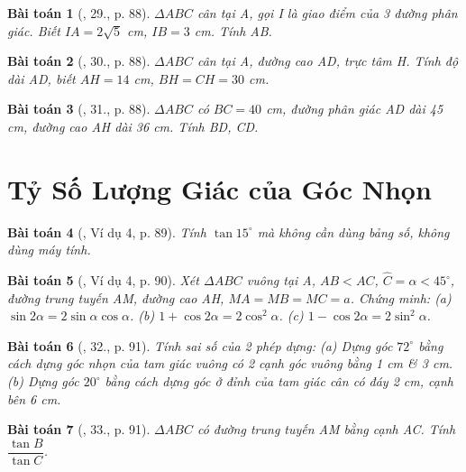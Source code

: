 \documentclass{article}
\newtheorem{baitoan}{Bài toán}
\begin{document}
\begin{baitoan}[\cite{Binh_Toan_9_tap_1}, 29., p. 88]
	$\Delta ABC$ cân tại A, gọi I là giao điểm của 3 đường phân giác. Biết $IA = 2\sqrt{5}$ {\rm cm}, $IB = 3$ {\rm cm}. Tính AB.
\end{baitoan}

\begin{baitoan}[\cite{Binh_Toan_9_tap_1}, 30., p. 88]
	$\Delta ABC$ cân tại A, đường cao AD, trực tâm H. Tính độ dài AD, biết $AH = 14$ {\rm cm}, $BH = CH = 30$ {\rm cm}.
\end{baitoan}

\begin{baitoan}[\cite{Binh_Toan_9_tap_1}, 31., p. 88]
	$\Delta ABC$ có $BC = 40$ {\rm cm}, đường phân giác AD dài {\rm45 cm}, đường cao AH dài {\rm36 cm}. Tính BD, CD.
\end{baitoan}


\section{Tỷ Số Lượng Giác của Góc Nhọn}

\begin{baitoan}[\cite{Binh_Toan_9_tap_1}, Ví dụ 4, p. 89]
	Tính $\tan15^\circ$ mà không cần dùng bảng số, không dùng máy tính.
\end{baitoan}

\begin{baitoan}[\cite{Binh_Toan_9_tap_1}, Ví dụ 4, p. 90]
	Xét $\Delta ABC$ vuông tại A, $AB < AC$, $\widehat{C} = \alpha  < 45^\circ$, đường trung tuyến AM, đường cao AH, $MA = MB = MC = a$. Chứng minh: (a) $\sin2\alpha = 2\sin\alpha\cos\alpha$. (b) $1 + \cos2\alpha = 2\cos^2\alpha$. (c) $1 - \cos2\alpha = 2\sin^2\alpha$.
\end{baitoan}

\begin{baitoan}[\cite{Binh_Toan_9_tap_1}, 32., p. 91]
	Tính sai số của 2 phép dựng: (a) Dựng góc $72^\circ$ bằng cách dựng góc nhọn của tam giác vuông có 2 cạnh góc vuông bằng {\rm1 cm} \& {\rm3 cm}. (b) Dựng góc $20^\circ$ bằng cách dựng góc ở đỉnh của tam giác cân có đáy {\rm2 cm}, cạnh bên {\rm6 cm}.
\end{baitoan}

\begin{baitoan}[\cite{Binh_Toan_9_tap_1}, 33., p. 91]
	$\Delta ABC$ có đường trung tuyến AM bằng cạnh AC. Tính $\dfrac{\tan B}{\tan C}$.
\end{baitoan}
\end{document}
